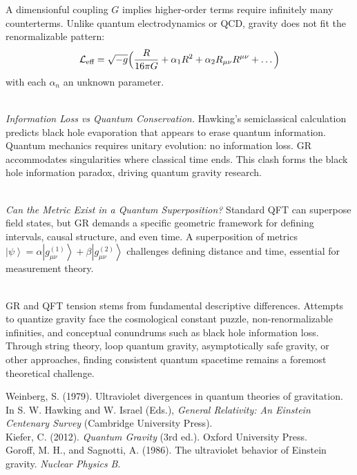 \begin{technical}
    A dimensionful coupling $G$ implies higher-order terms require infinitely many counterterms. Unlike quantum electrodynamics or QCD, gravity does not fit the renormalizable pattern:
    \[
        \mathcal{L}_\text{eff} = \sqrt{-g}\Bigl(\frac{R}{16\pi G} + \alpha_1 R^2 + \alpha_2 R_{\mu\nu}R^{\mu\nu} + \dots\Bigr)
    \]
    with each $\alpha_n$ an unknown parameter.

    \\[0.25em]
    \textit{Information Loss vs Quantum Conservation.}
    Hawking's semiclassical calculation predicts black hole evaporation that appears to erase quantum information. Quantum mechanics requires unitary evolution: no information loss. GR accommodates singularities where classical time ends. This clash forms the black hole information paradox, driving quantum gravity research.

    \\[0.25em]
    \textit{Can the Metric Exist in a Quantum Superposition?}
    Standard QFT can superpose field states, but GR demands a specific geometric framework for defining intervals, causal structure, and even time. A superposition of metrics $\left|\psi\right> = \alpha \left|g_{\mu\nu}^{(1)}\right> + \beta \left|g_{\mu\nu}^{(2)}\right>$ challenges defining distance and time, essential for measurement theory.

    \\[0.25em]
    GR and QFT tension stems from fundamental descriptive differences. Attempts to quantize gravity face the cosmological constant puzzle, non-renormalizable infinities, and conceptual conundrums such as black hole information loss. Through string theory, loop quantum gravity, asymptotically safe gravity, or other approaches, finding consistent quantum spacetime remains a foremost theoretical challenge.

        \techref
{\footnotesize
Weinberg, S. (1979). Ultraviolet divergences in quantum theories of gravitation. In S. W. Hawking and W. Israel (Eds.), \textit{General Relativity: An Einstein Centenary Survey} (Cambridge University Press).\\
Kiefer, C. (2012). \textit{Quantum Gravity} (3rd ed.). Oxford University Press.\\
Goroff, M. H., and Sagnotti, A. (1986). The ultraviolet behavior of Einstein gravity. \textit{Nuclear Physics B}.
}

\end{technical}
